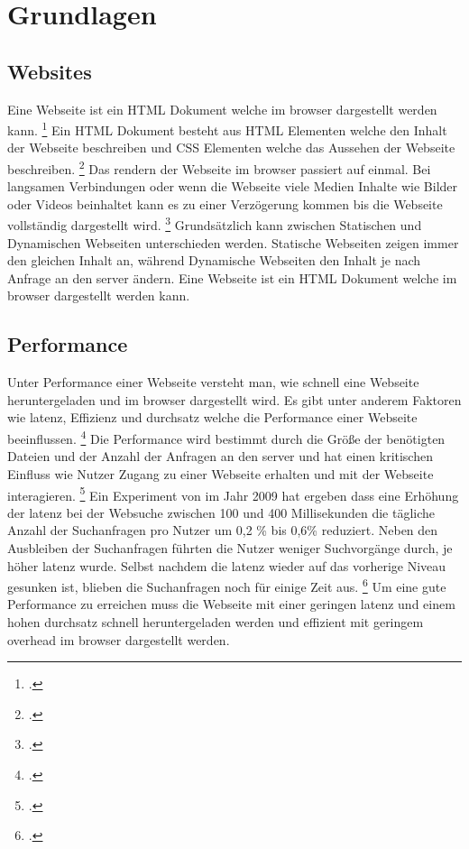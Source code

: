 \section{Grundlagen}

\subsection{Websites}
Eine Webseite ist ein \ac{HTML} Dokument welche im \gls{browser} dargestellt werden kann. \footcite[Vgl.][Seite 27]{Robbins2018}
Ein \ac{HTML} Dokument besteht aus \ac{HTML} Elementen welche den Inhalt der Webseite beschreiben und \ac{CSS} Elementen welche das Aussehen der Webseite beschreiben. \footcite[Vgl.][Seite 29]{Robbins2018}
Das rendern der Webseite im \gls{browser} passiert auf einmal. Bei langsamen Verbindungen oder wenn die Webseite viele Medien Inhalte wie Bilder oder Videos beinhaltet kann es zu einer Verzögerung kommen bis die Webseite vollständig dargestellt wird. \footcite[Vgl.][Seite 31]{Robbins2018}
Grundsätzlich kann zwischen Statischen und Dynamischen Webseiten unterschieden werden.
Statische Webseiten zeigen immer den gleichen Inhalt an, während Dynamische Webseiten den Inhalt je nach Anfrage an den \gls{server} ändern.
\newline
Eine Webseite ist ein \ac{HTML} Dokument welche im \gls{browser} dargestellt werden kann.

\subsection{Performance}
Unter Performance einer Webseite versteht man, wie schnell eine Webseite heruntergeladen und im \gls{browser} dargestellt wird.
Es gibt unter anderem Faktoren wie \gls{latenz}, Effizienz und \gls{durchsatz} welche die Performance einer Webseite beeinflussen. \footcite[Vgl.][Seite 53]{Killelea2002}
Die Performance wird bestimmt durch die Größe der benötigten Dateien und der Anzahl der Anfragen an den \gls{server}
und hat einen kritischen Einfluss wie Nutzer Zugang zu einer Webseite erhalten und mit der Webseite interagieren. \footcite[Vgl.][Seite 44]{Robbins2018}
Ein Experiment von  im Jahr 2009 hat ergeben dass eine Erhöhung der \gls{latenz} bei der Websuche zwischen 100 und 400 Millisekunden die tägliche
Anzahl der Suchanfragen pro Nutzer um 0,2 \% bis 0,6\% reduziert.
Neben den Ausbleiben der Suchanfragen führten die Nutzer weniger Suchvorgänge durch, je höher \gls{latenz} wurde.
Selbst nachdem die \gls{latenz} wieder auf das vorherige Niveau gesunken ist, blieben die Suchanfragen noch für einige Zeit aus. \footcite[Vgl.][Seite 1]{Google2009}
\newline
Um eine gute Performance zu erreichen muss die Webseite mit einer geringen \gls{latenz} und einem hohen \gls{durchsatz} schnell heruntergeladen werden
und effizient mit geringem \gls{overhead} im \gls{browser} dargestellt werden.

